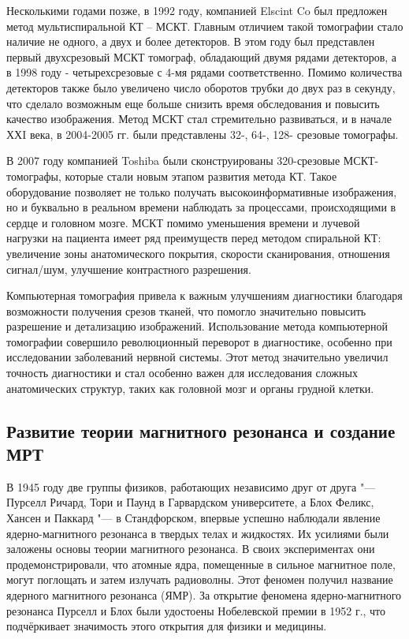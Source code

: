 Несколькими годами позже, в 1992 году, компанией Elscint Co был предложен метод мультиспиральной КТ – МСКТ. Главным отличием такой томографии стало наличие не одного, а двух и более детекторов. В этом году был представлен первый двухсрезовый МСКТ томограф, обладающий двумя рядами детекторов, а в 1998 году - четырехсрезовые с 4-мя рядами соответственно. Помимо количества детекторов также было увеличено число оборотов трубки до двух раз в секунду, что сделало возможным еще больше снизить время обследования и повысить качество изображения. Метод МСКТ стал стремительно развиваться, и в начале ХХI века, в 2004-2005 гг. были представлены 32-, 64-, 128- срезовые томографы\cite{one}. 

В 2007 году компанией Toshiba были сконструированы 320-срезовые МСКТ-томографы, которые стали новым этапом развития метода КТ. Такое оборудование позволяет не только получать высокоинформативные изображения, но и буквально в реальном времени наблюдать за процессами, происходящими в сердце и головном мозге. МСКТ помимо уменьшения времени и лучевой нагрузки на пациента имеет ряд преимуществ перед методом спиральной КТ: увеличение зоны анатомического покрытия, скорости сканирования, отношения сигнал/шум, улучшение контрастного разрешения\cite{one}. 

 Компьютерная томография привела к важным улучшениям диагностики благодаря возможности получения срезов тканей, что помогло значительно повысить разрешение и детализацию изображений. Использование метода компьютерной томографии совершило революционный переворот в диагностике, особенно при исследовании заболеваний нервной системы.  Этот метод значительно увеличил точность диагностики и стал особенно важен для исследования сложных анатомических структур, таких как головной мозг и органы грудной клетки\cite{history}.

 \subsection{Развитие теории магнитного резонанса и создание МРТ}

В 1945 году две группы физиков, работающих независимо друг от друга "--- Пурселл Ричард, Тори и Паунд в Гарвардском университете, а Блох Феликс, Хансен и Паккард "--- в Стандфорском, впервые успешно наблюдали явление ядерно-магнитного резонанса в твердых телах и жидкостях.  Их усилиями были заложены основы теории магнитного резонанса. В своих экспериментах они продемонстрировали, что атомные ядра, помещенные в сильное магнитное поле, могут поглощать и затем излучать радиоволны. Этот феномен получил название ядерного магнитного резонанса (ЯМР). За открытие феномена ядерно-магнитного резонанса Пурселл и Блох были удостоены Нобелевской премии в 1952 г., что подчёркивает значимость этого открытия для физики и медицины\cite{history}.

